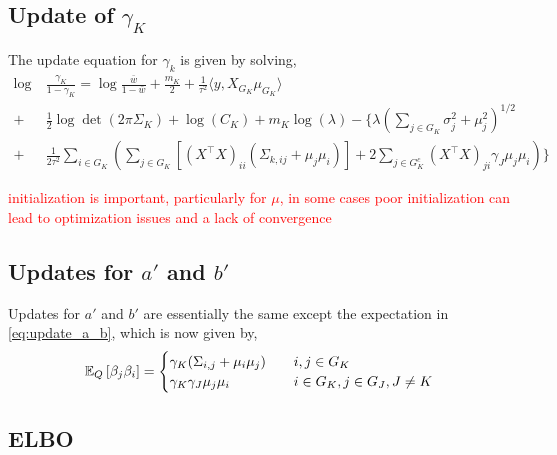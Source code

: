 \documentclass[12pt]{article}
\renewcommand{\red}[1]{\textcolor{red}{#1}}
\begin{document}
\subsection{Update of $\gamma_K$}

The update equation for $\gamma_k$ is given by solving,
\begin{equation} \label{eq:QD_update_gamma} 
\begin{aligned}
    \log &\ \frac{\gamma_K}{1-\gamma_K} = 
    \log \frac{\bar{w}}{1-\bar{w}}
+ 
    \frac{m_K}{2}  
+
    \frac{1}{\tau^2} \langle y, X_{G_K} \mu_{G_K} \rangle  \\
+ &\ 
    \frac{1}{2} \log \det \left( 2 \pi \Sigma_K \right)
+
    \log(C_K )
+
    m_K \log (\lambda)
-
\Bigg\{ 
    \lambda \left( \sum_{j \in G_K} 
	\sigma_j^2 + \mu_j^2
    \right)^{1/2}  \\
+ &\
    \frac{1}{2\tau^2}
    \sum_{i \in G_K} \left( 
    \sum_{j \in G_K} \left[
	(X^\top X)_{ii} (\Sigma_{k, ij} + \mu_j \mu_i)
    \right]
+
    2 \sum_{j \in G_K^c} (X^\top X)_{ji} 
	\gamma_{J} \mu_j \mu_i
    \right )
\Bigg\}
\end{aligned}
\end{equation}

\red{initialization is important, particularly for $\mu$, in some cases poor initialization can lead to optimization issues and a lack of convergence}

\subsection{Updates for $a'$ and $b'$}

Updates for $a'$ and $b'$ are essentially the same except the expectation in \eqref{eq:update_a_b}, which is now given by,
\begin{equation}
    \mathbb{E}_{Q} \left[ \beta_j \beta_i \right] = \begin{cases}
	\gamma_K (\Sigma_{i, j} + \mu_{i} \mu_{j}) & \quad i,j \in G_K \\
	\gamma_K \gamma_J \mu_{j}\mu_{i} 	& \quad i \in G_K, j \in G_J, J \neq K
    \end{cases}
\end{equation}

\subsection{ELBO}
\end{document}
